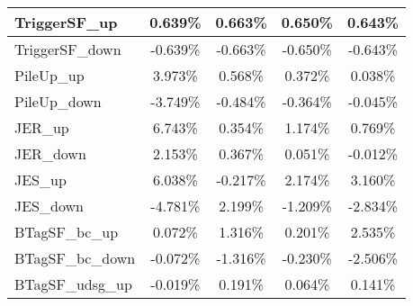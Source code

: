 \begin{table}[]
{\begin{tabular}{|l|c|c|c|c|}
TriggerSF\_up                               & 0.639\%                                & 0.663\%                                & 0.650\%                               & 0.643\%                                \\ \hline 
TriggerSF\_down                             & -0.639\%                              & -0.663\%                              & -0.650\%                             & -0.643\%                              \\ \hline 
PileUp\_up                             & 3.973\%                              & 0.568\%                              & 0.372\%                             & 0.038\%                              \\ \hline 
PileUp\_down                           & -3.749\%                            & -0.484\%                            & -0.364\%                           & -0.045\%                            \\ \hline 
JER\_up                         & 6.743\%                          & 0.354\%                          & 1.174\%                         & 0.769\%                          \\ \hline     
JER\_down                       & 2.153\%                        & 0.367\%                        & 0.051\%                       & -0.012\%                        \\ \hline    
JES\_up                                 & 6.038\%                                  & -0.217\%                                  & 2.174\%                                 & 3.160\%                                  \\ \hline    
JES\_down                               & -4.781\%                                & 2.199\%                                & -1.209\%                               & -2.834\%                                \\ \hline    
BTagSF\_bc\_up                              & 0.072\%                               & 1.316\%                               & 0.201\%                              & 2.535\%                               \\ \hline    
BTagSF\_bc\_down                            & -0.072\%                             & -1.316\%                             & -0.230\%                            & -2.506\%                             \\ \hline    
BTagSF\_udsg\_up                            & -0.019\%                             & 0.191\%                             & 0.064\%                            & 0.141\%                             \\ \hline     

\end{tabular}}
\end{table}
